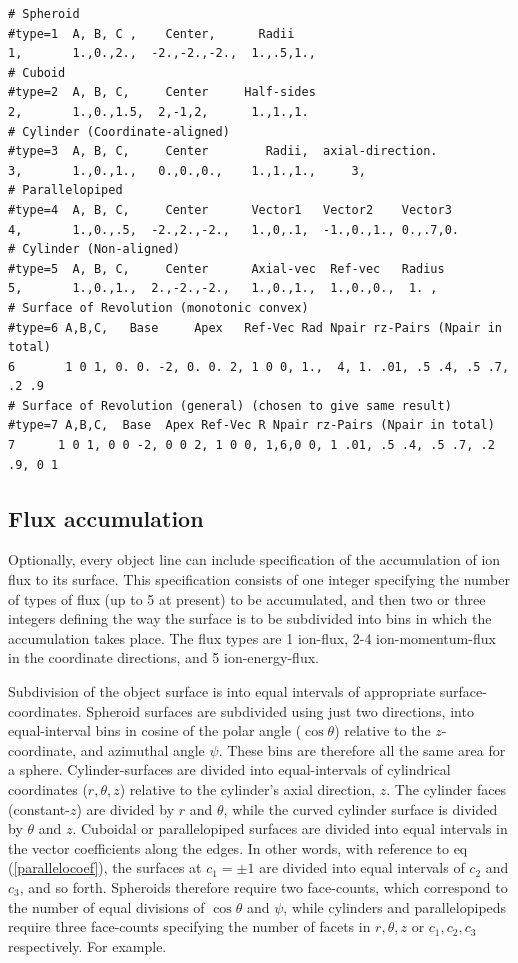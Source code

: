 \documentclass[12pt]{article}
\begin{document}
\begin{verbatim}
# Spheroid
#type=1  A, B, C ,    Center,      Radii
1,       1.,0.,2.,  -2.,-2.,-2.,  1.,.5,1., 
# Cuboid
#type=2  A, B, C,     Center     Half-sides
2,       1.,0.,1.5,  2,-1,2,      1.,1.,1.
# Cylinder (Coordinate-aligned)
#type=3  A, B, C,     Center        Radii,  axial-direction. 
3,       1.,0.,1.,   0.,0.,0.,    1.,1.,1.,     3,
# Parallelopiped
#type=4  A, B, C,     Center      Vector1   Vector2    Vector3
4,       1.,0.,.5,  -2.,2.,-2.,   1.,0,.1,  -1.,0.,1., 0.,.7,0.
# Cylinder (Non-aligned)
#type=5  A, B, C,     Center      Axial-vec  Ref-vec   Radius
5,       1.,0.,1.,  2.,-2.,-2.,   1.,0.,1.,  1.,0.,0.,  1. ,
# Surface of Revolution (monotonic convex)
#type=6 A,B,C,   Base     Apex   Ref-Vec Rad Npair rz-Pairs (Npair in total)
6       1 0 1, 0. 0. -2, 0. 0. 2, 1 0 0, 1.,  4, 1. .01, .5 .4, .5 .7, .2 .9
# Surface of Revolution (general) (chosen to give same result)
#type=7 A,B,C,  Base  Apex Ref-Vec R Npair rz-Pairs (Npair in total)
7      1 0 1, 0 0 -2, 0 0 2, 1 0 0, 1,6,0 0, 1 .01, .5 .4, .5 .7, .2 .9, 0 1

\end{verbatim}

\subsection{Flux accumulation}

Optionally, every object line can include specification of the
accumulation of ion flux to its surface. This specification consists
of one integer specifying the number of types of flux (up to 5 at
present) to be accumulated, and then two or three integers defining
the way the surface is to be subdivided into bins in which the
accumulation takes place. The flux types are 1 ion-flux, 2-4
ion-momentum-flux in the coordinate directions, and 5 ion-energy-flux.

Subdivision of the object surface is into equal intervals of
appropriate surface-coordinates. Spheroid surfaces are subdivided
using just two directions, into equal-interval bins in cosine of the
polar angle ($\cos\theta$) relative to the $z$-coordinate, and
azimuthal angle $\psi$. These bins are therefore all the same
area for a sphere. Cylinder-surfaces are divided into equal-intervals of
cylindrical coordinates ($r,\theta,z$) relative to the cylinder's
axial direction, $z$. The cylinder faces (constant-$z$) are divided by
$r$ and $\theta$, while the curved cylinder surface is divided by
$\theta$ and $z$. Cuboidal or parallelopiped surfaces are divided
into equal intervals in the vector coefficients along the edges. In
other words, with reference to eq (\ref{parallelocoef}), the surfaces
at $c_1=\pm1$ are divided into equal intervals of $c_2$ and $c_3$, and
so forth. Spheroids therefore require two face-counts, which
correspond to the number of equal divisions of $\cos\theta$ and
$\psi$, while cylinders and parallelopipeds require three face-counts
specifying the number of facets in $r,\theta,z$ or $c_1,c_2,c_3$
respectively. For example.
\end{document}
